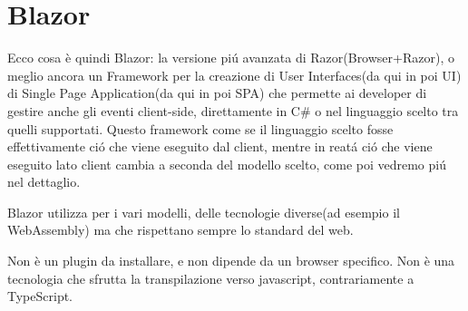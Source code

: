 \section{Blazor}
Ecco cosa \`e quindi Blazor: la versione pi\'u avanzata di Razor(Browser+Razor\cite{blazorWikiGitHub}), o meglio ancora un Framework per la creazione di User Interfaces(da qui in poi UI) di Single Page Application(da qui in poi SPA) che permette ai developer di gestire anche gli eventi client-side, direttamente in C\# o nel linguaggio scelto tra quelli supportati.
Questo framework come se il linguaggio scelto fosse effettivamente ci\'o che viene eseguito dal client, mentre in reat\'a ci\'o che viene eseguito lato client cambia a seconda del modello scelto, come poi vedremo pi\'u nel dettaglio.

Blazor utilizza per i vari modelli, delle tecnologie diverse(ad esempio il WebAssembly) ma che rispettano sempre lo standard del web.

Non \`e un plugin da installare, e non dipende da un browser specifico.
Non \`e una tecnologia che sfrutta la transpilazione verso javascript, contrariamente a TypeScript.